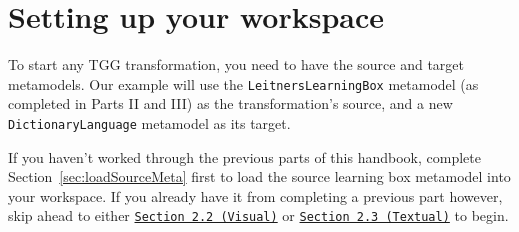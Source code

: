\newpage
\section{Setting up your workspace}
\genHeader

To start any TGG transformation, you need to have the source and target metamodels. Our example will use the \texttt{LeitnersLearningBox} metamodel (as
completed in Parts II and III) as the transformation's source, and a new \texttt{DictionaryLanguage} metamodel as its target.

If you haven't worked through the previous parts of this handbook, complete Section~\ref{sec:loadSourceMeta} first to load the source learning box metamodel
into your workspace. If you already have it from completing a previous part however, skip ahead to either
\texttt{\hyperlink{sec:multiEAP}{Section 2.2 (Visual)}} or \texttt{\hyperlink{sec:multiMOSL}{Section 2.3 (Textual)}} to begin.







